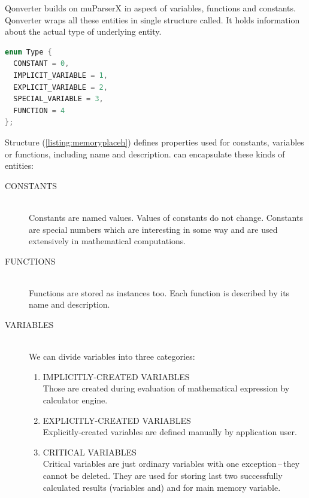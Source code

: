 Qonverter builds on muParserX in aspect of variables, functions and constants. Qonverter wraps all these entities in single structure called. It holds information about the actual type of underlying entity.
\begin{lstlisting}[firstnumber=1,language=cpp]
enum Type {
  CONSTANT = 0,
  IMPLICIT_VARIABLE = 1,
  EXPLICIT_VARIABLE = 2,
  SPECIAL_VARIABLE = 3,
  FUNCTION = 4
};
\end{lstlisting}
Structure (\autoref{listing:memoryplaceh}) defines properties used for constants, variables or functions, including name and description. can encapsulate these kinds of entities:
\begin{description}
\item[CONSTANTS] \hfill \\
Constants are named values. Values of constants do not change. Constants are special numbers which are interesting in some way and are used extensively in mathematical computations.
\item[FUNCTIONS] \hfill \\
Functions are stored as instances too. Each function is described by its name and description.
\item[VARIABLES] \hfill \\
We can divide variables into three categories:
\begin{enumerate}
\item IMPLICITLY-CREATED VARIABLES \\[3px]
Those are created during evaluation of mathematical expression by calculator engine.
\item EXPLICITLY-CREATED VARIABLES \\[3px]
Explicitly-created variables are defined manually by application user.
\item CRITICAL VARIABLES \\[3px]
Critical variables are just ordinary variables with one exception\,--\,they cannot be deleted. They are used for storing last two successfully calculated results (variables and) and for main memory variable.
\end{enumerate}
\end{description}

